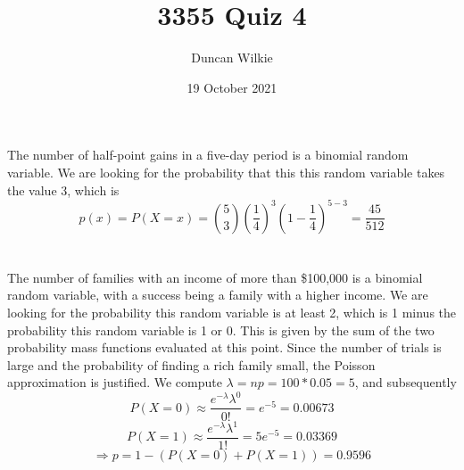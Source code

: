\documentclass{article}
\title{3355 Quiz 4}
\author{Duncan Wilkie}
\date{19 October 2021}
\begin{document}
\maketitle
\section{}
The number of half-point gains in a five-day period is a binomial random variable. We are looking for the probability that this this random variable takes the value 3, which is \[p(x)=P(X=x)=\binom{5}{3}\left( \frac{1}{4} \right)^3\left( 1-\frac{1}{4} \right)^{5-3}=\frac{45}{512}\]

\section{}
The number of families with an income of more than \$100,000 is a binomial random variable, with a success being a family with a higher income. We are looking for the probability this random variable is at least 2, which is 1 minus the probability this random variable is 1 or 0. This is given by the sum of the two probability mass functions evaluated at this point. Since the number of trials is large and the probability of finding a rich family small, the Poisson approximation is justified. We compute $\lambda =np = 100 * 0.05 = 5$, and subsequently
\[P(X=0) \approx \frac{e^{-\lambda}\lambda^0}{0!}=e^{-5}=0.00673\]
\[P(X=1)\approx \frac{e^{-\lambda}\lambda^1}{1!}=5e^{-5}=0.03369\]
\[\Rightarrow p = 1 - (P(X=0) + P(X=1)) = 0.9596\]
\end{document}
